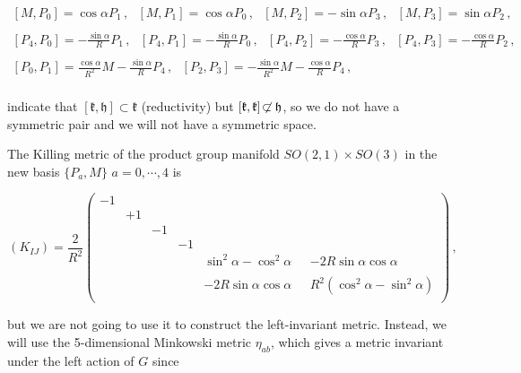 \documentclass[12pt,a4paper]{article}
\begin{document}
\begin{equation}
  \begin{array}{c}
[M,P_{0}] = \cos{\alpha}P_{1}\, ,
\,\,\,\, 
[M,P_{1}] = \cos{\alpha}P_{0}\, ,
\,\,\,\, 
[M,P_{2}] = -\sin{\alpha}P_{3}\, ,
\,\,\,\, 
[M,P_{3}]= \sin{\alpha}P_{2}\, ,
\\
\\
\left[P_{4},P_{0}\right]= -\frac{\sin{\alpha}}{R}P_{1}\, ,
\,\,\,\,
\left[P_{4},P_{1}\right]= -\frac{\sin{\alpha}}{R}P_{0}\, ,
\,\,\,\,
\left[P_{4},P_{2}\right]= -\frac{\cos{\alpha}}{R}P_{3}\, ,
\,\,\,\,
\left[P_{4},P_{3}\right]= -\frac{\cos{\alpha}}{R}P_{2}\, ,
\\
\\
\left[ P_{0}, P_{1}\right]= 
\frac{\cos{\alpha}}{R^{2}} M -\frac{\sin{\alpha}}{R}P_{4}\, ,
\,\,\,\,
[P_{2}, P_{3}]= 
-\frac{\sin{\alpha}}{R^{2}} M -\frac{\cos{\alpha}}{R}P_{4}\, ,
\\
\end{array}
\end{equation}

\noindent
indicate that $[\mathfrak{k},\mathfrak{h}]\subset \mathfrak{k}$
(reductivity) but $[\mathfrak{k},\mathfrak{k}]\not\!\subset
\mathfrak{h}$, so we do not have a symmetric pair and we will not have
a symmetric space.

The Killing metric of the product group manifold $SO(2,1)\times SO(3)$
in the new basis $\{P_{a},M\}$ $a=0,\cdots,4$ is

\begin{equation}
(K_{IJ})= 
\frac{2}{R^{2}}
\left(
  \begin{array}{cccccc}
-1 &    &    &    &    &    \\
   & +1 &    &    &    &    \\
   &    & -1 &    &    &    \\
   &    &    & -1 &    &    \\
   &    &    &    & 
\sin^{2}{\alpha}-\cos^{2}{\alpha} & -2R\sin{\alpha}\cos{\alpha}\\
   &    &    &    &    &    \\
   &    &    &    &    
-2R\sin{\alpha}\cos{\alpha}\,\,\,\,  & R^{2}(\cos^{2}{\alpha}-\sin^{2}{\alpha})
                            \\
  \end{array}
\right)\, ,
\end{equation}

\noindent
but we are not going to use it to construct the left-invariant metric.
Instead, we will use the 5-dimensional Minkowski metric $\eta_{ab}$,
which gives a metric invariant under the left action of $G$ since
\end{document}
